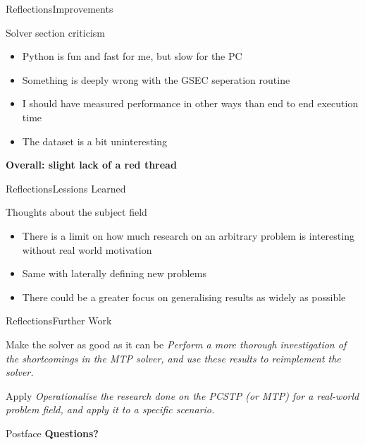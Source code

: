 \documentclass[rgb,dvipsnames]{beamer}
\begin{document}
\begin{frame}{Reflections}{Improvements}
  \begin{block}{Solver section criticism}
    \begin{itemize}[<+->]
    \item Python is fun and fast for me, but slow for the PC
    \item Something is deeply wrong with the GSEC seperation routine
    \item I should have measured performance in other ways than end to end execution time
    \item The dataset is a bit uninteresting
    \end{itemize}
  \end{block}\pause
  \textbf{Overall: slight lack of a red thread}
\end{frame}


\begin{frame}{Reflections}{Lessions Learned}
  \begin{block}{Thoughts about the subject field}
    \begin{itemize}[<+->]
    \item There is a limit on how much research on an arbitrary problem is interesting
      without real world motivation
    \item Same with laterally defining new problems
    \item There could be a greater focus on generalising
      results as widely as possible
    \end{itemize}
  \end{block}
\end{frame}

\begin{frame}{Reflections}{Further Work}
  \begin{block}{Make the solver as good as it can be}
    \textit{Perform a more thorough investigation of the shortcomings in the MTP
    solver, and use these results to reimplement the solver.}
  \end{block}

  \begin{block}{Apply}
    \textit{Operationalise the research done on the PCSTP (or MTP) for a real-world
    problem field, and apply it to a specific scenario.}
  \end{block}
\end{frame}


\begin{frame}{Postface}
  \pause
  \large\textbf{Questions?}
\end{frame}
\end{document}
